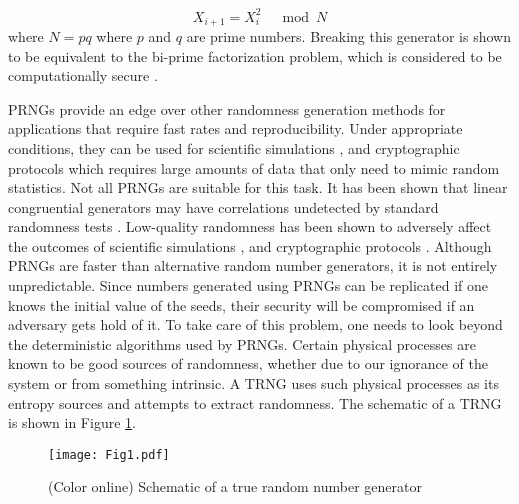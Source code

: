 \documentclass[]{interact}
\theoremstyle{plain}%
\theoremstyle{definition}
\theoremstyle{remark}
\begin{document}
$$
    X_{i+1}=X_{i}^{2} \quad \bmod N
$$
where $N=pq$ where $p$ and $q$ are prime numbers. Breaking this generator is shown to be equivalent to the bi-prime factorization problem, which is considered to be computationally secure \cite{10.1007/3-540-39568-7_17}.

PRNGs provide an edge over other randomness generation methods for applications that require fast rates and reproducibility. Under appropriate conditions, they can be used for scientific simulations \cite{doi:10.1080/01621459.1949.10483310}, and cryptographic protocols \cite{ferguson2011cryptography} which requires large amounts of data that only need to mimic random statistics. Not all PRNGs are suitable for this task. It has been shown that linear congruential generators may have correlations undetected by standard randomness tests \cite{Marsaglia25}. Low-quality randomness has been shown to adversely affect the outcomes of scientific simulations \cite{10.1145/1276927.1276928}, and cryptographic protocols \cite{PhysRevA.86.062308}. Although PRNGs are faster than alternative random number generators, it is not entirely unpredictable. Since numbers generated using PRNGs can be replicated if one knows the initial value of the seeds, their security will be compromised if an adversary gets hold of it. To take care of this problem, one needs to look beyond the deterministic algorithms used by PRNGs. Certain physical processes are known to be good sources of randomness, whether due to our ignorance of the system or from something intrinsic. A TRNG uses such physical processes as its entropy sources and attempts to extract randomness. The schematic of a TRNG is shown in Figure \ref{fig1}.

    \begin{figure}[tb]
    \texttt{[image: Fig1.pdf]}
    \caption{(Color online) Schematic of a true random number generator } 
    \label{fig1}
    \end{figure}
\end{document}
